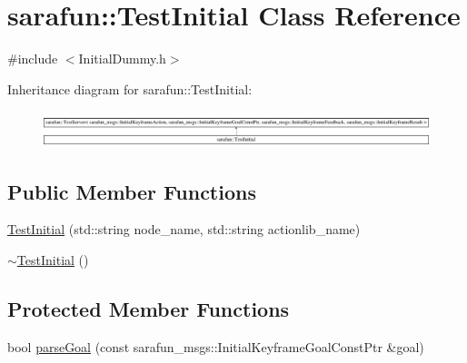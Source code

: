\hypertarget{classsarafun_1_1TestInitial}{\section{sarafun\-:\-:Test\-Initial Class Reference}
\label{classsarafun_1_1TestInitial}
}


{\ttfamily \#include $<$Initial\-Dummy.\-h$>$}

Inheritance diagram for sarafun\-:\-:Test\-Initial\-:\begin{figure}[H]
\begin{center}
\leavevmode
\includegraphics[height=1.066667cm]{classsarafun_1_1TestInitial}
\end{center}
\end{figure}
\subsection*{Public Member Functions}
\begin{DoxyCompactItemize}
\item 
\hyperlink{classsarafun_1_1TestInitial_a823bdc6188c1f3cdf7546b2ed9ea7ea7}{Test\-Initial} (std\-::string node\-\_\-name, std\-::string actionlib\-\_\-name)
\item 
\hyperlink{classsarafun_1_1TestInitial_af9c5ec764aeb3f64c640714844dc23c4}{$\sim$\-Test\-Initial} ()
\end{DoxyCompactItemize}
\subsection*{Protected Member Functions}
\begin{DoxyCompactItemize}
\item 
bool \hyperlink{classsarafun_1_1TestInitial_a8f5793099cb6078feadada77538d515b}{parse\-Goal} (const sarafun\-\_\-msgs\-::\-Initial\-Keyframe\-Goal\-Const\-Ptr \&goal)
\end{DoxyCompactItemize}


